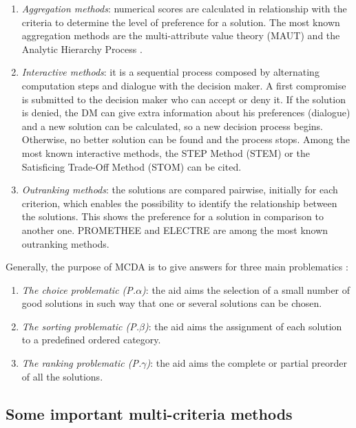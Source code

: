 \begin{enumerate}
\item \textit{Aggregation methods}: numerical scores are calculated in relationship with the criteria to determine the level of preference for a solution. The most known aggregation methods are the multi-attribute value theory (MAUT) \cite{MMAUT} and the Analytic Hierarchy Process \cite{MAHP}.
\item \textit{Interactive methods}: it is a sequential process composed by alternating computation steps and dialogue with the decision maker. A first compromise is submitted to the decision maker who can accept or deny it. If the solution is denied, the DM can give extra information about his preferences (dialogue) and a new solution can be calculated, so a new decision process begins. Otherwise, no better solution can be found and the process stops. Among the most known interactive methods, the STEP Method (STEM) \cite{benayoun71} or the Satisficing Trade-Off Method (STOM) \cite{nakayama84} can be cited.
\item \textit{Outranking methods}: the solutions are compared pairwise, initially for each criterion, which enables the possibility to identify the relationship between the solutions. This shows the preference for a solution in comparison to another one. PROMETHEE \cite{Brans1} and ELECTRE \cite{Roy66} are among the most known outranking methods.
\end{enumerate}


Generally, the purpose of MCDA is to give answers for three main problematics \cite{EhrgottFigueiraGreco2005}:
\begin{enumerate}
\item \textit{The choice problematic (P.$\alpha$)}: the aid aims the selection of a small number of good solutions in such way that one or several solutions can be chosen.
\item \textit{The sorting problematic (P.$\beta$)}: the aid aims the assignment of each solution to a predefined ordered category.
\item \textit{The ranking problematic (P.$\gamma$)}: the aid aims the complete or partial preorder of all the solutions.
\end{enumerate}

\subsection{Some important multi-criteria methods}
\label{subsec:mcdamethods}

